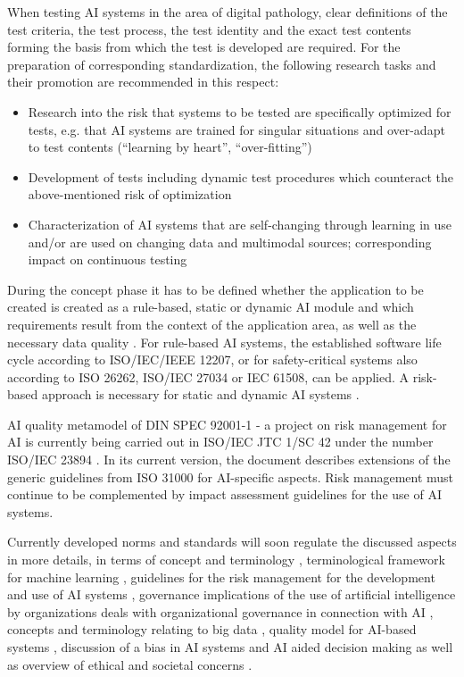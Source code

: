 When testing AI systems in the area of digital pathology, clear definitions of the test criteria, the test process, the test identity and the exact test contents forming the basis from which the test is developed are required. For the preparation of corresponding standardization, the following research tasks and their promotion are recommended in this respect: 
\begin{itemize} 
\item Research into the risk that systems to be tested are specifically optimized for tests, e.g. that AI systems are trained for singular situations and over-adapt to test contents (“learning by heart”, “over-fitting”) 
\item Development of tests including dynamic test procedures which counteract the above-mentioned risk of optimization 
\item Characterization of AI systems that are self-changing through learning in use and/or are used on changing data and multimodal sources; corresponding impact on continuous testing
\end{itemize}

During the concept phase it has to be defined whether the application to be created is created as a rule-based, static or dynamic AI module and which requirements result from the context of the application area, as well as the necessary data quality \cite{DIN_SPEC_92001-1} \cite{DIN_SPEC_92001-2}. For rule-based AI systems, the established software life cycle according to ISO/IEC/IEEE 12207, or for safety-critical systems also according to ISO 26262, ISO/IEC 27034 or IEC 61508, can be applied. A risk-based approach is necessary for static and dynamic AI systems \cite{DIN_ISO_31000}.

AI quality metamodel of DIN SPEC 92001-1 \cite{DIN_SPEC_92001-1} - a project on risk management for AI is currently being carried out in ISO/IEC JTC 1/SC 42 under the number ISO/IEC 23894 \cite{ISO_IEC_23894}. In its current version, the document describes extensions of the generic guidelines from ISO 31000 \cite{DIN_ISO_31000} for AI-specific aspects. Risk management must continue to be complemented by impact assessment guidelines for the use of AI systems.

Currently developed norms and standards will soon regulate the discussed aspects in more details, in terms of concept and terminology \cite{ISO_IEC_22989}, terminological framework for machine learning \cite{ISO_IEC_23053}, guidelines for the risk management for the development and use of AI systems \cite{ISO_IEC_23894}, governance implications of the use of artificial intelligence by organizations deals with organizational governance in connection with AI \cite{ISO_IEC_38507}, concepts and terminology relating to big data \cite{ISO_IEC_20546}, quality model for AI-based systems \cite{ISO_IEC_5059}, discussion of a bias in AI systems and AI aided decision making \cite{ISO_IEC_TR_24027} as well as overview of ethical and societal concerns \cite{ISO_IEC_TR_24368}. 

